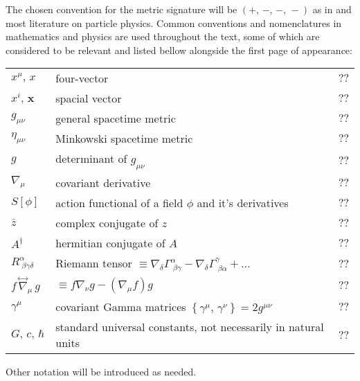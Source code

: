 
The chosen convention for the metric signature will be $(+,\,-,\,-,\,-)$ as in \cite{BirrellDavies} and most literature on particle physics. Common conventions and nomenclatures in mathematics and physics are used throughout the text, some of which are considered to be relevant and listed bellow alongside the first page of appearance:\newline

\begin{tabular}{p{1.75cm}p{10cm}p{1.5cm}}
	
	$x^\mu,\,x$ & four-vector & $??$\\
	$x^i,\,\mathbf{x}$ & spacial vector & $??$\\
	$g_{\mu\nu}$ & general spacetime metric & $??$\\
	$\eta_{\mu\nu}$ & Minkowski spacetime metric & $??$\\
	$g$ & determinant of $g_{\mu\nu}$ & $??$\\
	$\nabla_\mu$ & covariant derivative & $??$\\
	$S[\phi]$ & action functional of a field $\phi$ and it's derivatives & $??$\\
	$\bar{z}$ & complex conjugate of $z$ & $??$\\
	$A^\dagger$ & hermitian conjugate of $A$ & $??$\\
	$R^\alpha_{\;\beta\gamma\delta}$ & Riemann tensor \quad $\equiv \nabla_\delta\Gamma^\alpha_{\;\beta\gamma}-\nabla_\delta\Gamma^\gamma_{\;\beta\alpha}+\hdots$& $??$\\
	$f\,\overset{\leftrightarrow}{\nabla}_\mu\, g$ &$\equiv f\nabla_\nu g-\left(\nabla_\mu f\right)g$ & $??$\\
	$\gamma^\mu$ & covariant Gamma matrices $\left\{\gamma^\mu,\,\gamma^\nu\right\}=2g^{\mu\nu}$ & $??$\\
	$G,\,c,\,\hbar$ & standard universal constants, not necessarily in natural units & $??$\\
	
\end{tabular}

\vspace*{0.5cm}
Other notation will be introduced as needed.